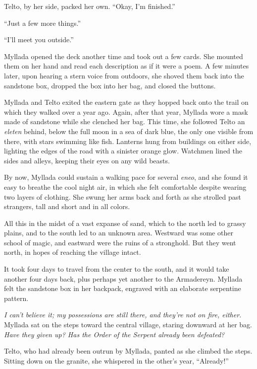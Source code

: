 Telto, by her side, packed her own. ``Okay, I'm finished.''

``Just a few more things.''

``I'll meet you outside.''

Myllada opened the deck another time and took out a few cards. She mounted them on her hand and read each description as if it were a poem. A few minutes later, upon hearing a stern voice from outdoors, she shoved them back into the sandstone box, dropped the box into her bag, and closed the buttons.

\centeredstars

Myllada and Telto exited the eastern gate as they hopped back onto the trail on which they walked over a year ago. Again, after that year, Myllada wore a mask made of sandstone while she clenched her bag. This time, she followed Telto an \emph{eleten} behind, below the full moon in a sea of dark blue, the only one visible from there, with stars swimming like fish. Lanterns hung from buildings on either side, lighting the edges of the road with a sinister orange glow. Watchmen lined the sides and alleys, keeping their eyes on any wild beasts.

By now, Myllada could sustain a walking pace for several \emph{eneo}, and she found it easy to breathe the cool night air, in which she felt comfortable despite wearing two layers of clothing. She swung her arms back and forth as she strolled past strangers, tall and short and in all colors.

All this in the midst of a vast expanse of sand, which to the north led to grassy plains, and to the south led to an unknown area. Westward was some other school of magic, and eastward were the ruins of a stronghold. But they went north, in hopes of reaching the village intact.

It took four days to travel from the center to the south, and it would take another four days back, plus perhaps yet another to the Armadereyn. Myllada felt the sandstone box in her backpack, engraved with an elaborate serpentine pattern.

\centeredstars

\emph{I can't believe it; my possessions are still there, and they're not on fire, either.} Myllada sat on the steps toward the central village, staring downward at her bag. \emph{Have they given up? Has the Order of the Serpent already been defeated?}

Telto, who had already been outrun by Myllada, panted as she climbed the steps. Sitting down on the granite, she whispered in the other's year, ``Already!''

